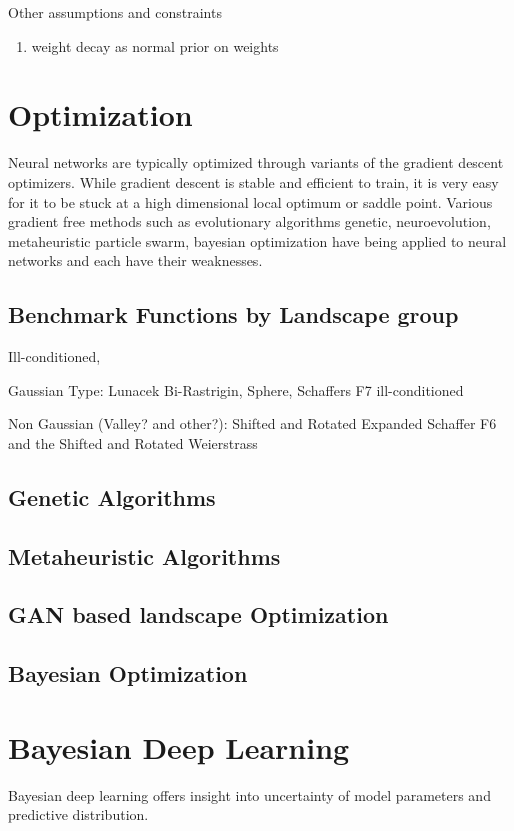 \documentclass[honours,12pt]{unswthesis}
\numberwithin{equation}{section}
\begin{document}
Other assumptions and constraints
\begin{enumerate}
\item weight decay as normal prior on weights
\end{enumerate}

\section{Optimization}
Neural networks are typically optimized through variants of the gradient descent optimizers. While gradient descent is stable and efficient to train, it is very easy for it to be stuck at a high dimensional local optimum or saddle point. Various gradient free methods such as evolutionary algorithms {genetic, neuroevolution}, metaheuristic {particle swarm}, bayesian optimization {} have being applied to neural networks and each have their weaknesses. 
\subsection{Benchmark Functions by Landscape group}
Ill-conditioned, 

Gaussian Type: Lunacek Bi-Rastrigin, Sphere, Schaffers F7 ill-conditioned

Non Gaussian (Valley? and other?): Shifted and Rotated Expanded Schaffer F6 and the Shifted and Rotated Weierstrass

\subsection{Genetic Algorithms}
\subsection{Metaheuristic Algorithms}
\subsection{GAN based landscape Optimization}
\subsection{Bayesian Optimization}

\section{Bayesian Deep Learning}
Bayesian deep learning offers insight into uncertainty of model parameters and predictive distribution. 
\end{document}
